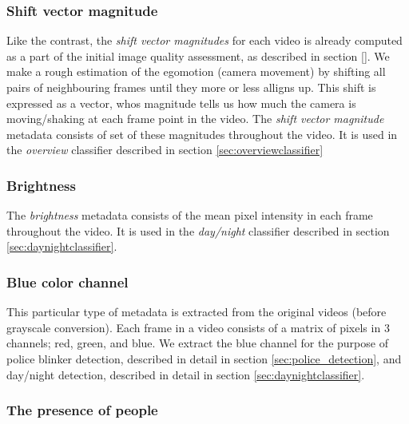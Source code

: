 \subsubsection{Shift vector magnitude}\label{sec:svmdata}
%
Like the contrast, the \textit{shift vector magnitudes} for each video is already computed as a part of the initial image quality assessment, as described in section \ref{}. We make a rough estimation of the egomotion (camera movement) by shifting all pairs of neighbouring frames until they more or less alligns up. This shift is expressed as a vector, whos magnitude tells us how much the camera is moving/shaking at each frame point in the video. The \textit{shift vector magnitude} metadata consists of set of these magnitudes throughout the video. It is used in the \textit{overview} classifier described in section \ref{sec:overviewclassifier}
%
\subsubsection{Brightness}\label{sec:brightnessdata}
%
The \textit{brightness} metadata consists of the mean pixel intensity in each frame throughout the video. It is used in the \textit{day/night} classifier described in section \ref{sec:daynightclassifier}.
%
\subsubsection{Blue color channel}\label{sec:blue_channel}
%
This particular type of metadata is extracted from the original videos (before grayscale conversion). Each frame in a video consists of a matrix of pixels in 3 channels; red, green, and blue. We extract the blue channel for the purpose of police blinker detection, described in detail in section \ref{sec:police_detection}, and day/night detection, described in detail in section \ref{sec:daynightclassifier}.
%
\subsubsection{The presence of people}\label{sec:peopledata}
%
%
%
%
%
%
%
